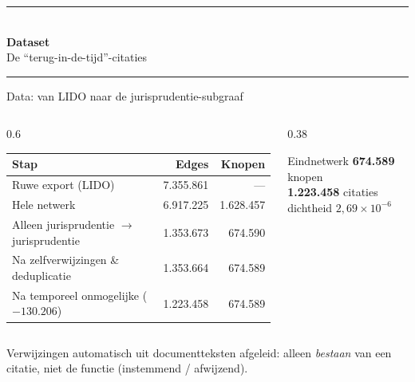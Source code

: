 \documentclass[aspectratio=169,11pt]{beamer}
\newcommand{\rd}[1]{\textcolor{uvared}{#1}}
\newcommand{\smallnote}[1]{{\footnotesize\color{uvagray}#1}}
\begin{document}
\begin{frame}[plain]
  \centering
  \vspace{1.4cm}
  {\color{uvared}\rule{0.5\textwidth}{1.2pt}}\\[0.7em]
  {\Large\bfseries Dataset}\\[0.4em]
  {\large De ``terug-in-de-tijd''-citaties}\\[0.7em]
  {\color{uvared}\rule{0.5\textwidth}{1.2pt}}
\end{frame}


\begin{frame}{Data: van LIDO naar de jurisprudentie-subgraaf}
  \footnotesize
  \begin{columns}[T]
    \begin{column}{0.6\textwidth}
      \begin{table}
        \centering\renewcommand{\arraystretch}{1.15}
        \begin{tabular}{@{}lrr@{}}
          \toprule
          Stap & Edges & Knopen \\
          \midrule
          Ruwe export (LIDO) & 7.355.861 & --- \\
          Hele netwerk & 6.917.225 & 1.628.457 \\
          Alleen jurisprudentie $\to$ jurisprudentie & 1.353.673 & 674.590 \\
          Na zelfverwijzingen \& deduplicatie & 1.353.664 & 674.589 \\
          \rd{Na temporeel onmogelijke ($-130.206$)} & \rd{1.223.458} & \rd{674.589} \\
          \bottomrule
        \end{tabular}
      \end{table}
    \end{column}
    \begin{column}{0.38\textwidth}
      \begin{block}{Eindnetwerk}
        \centering
        \textbf{674.589} knopen\\
        \textbf{1.223.458} citaties\\
        dichtheid $2{,}69\times10^{-6}$
      \end{block}
    \end{column}
  \end{columns}
  \vspace{0.5em}
  \smallnote{Verwijzingen automatisch uit documentteksten afgeleid: alleen \emph{bestaan} van een citatie, niet de functie (instemmend / afwijzend).}
\end{frame}
\end{document}
